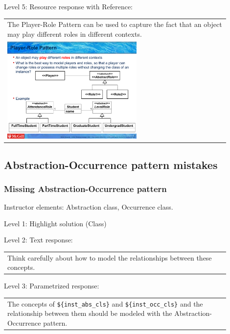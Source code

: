 \noindent Level 5: Resource response with Reference: \medskip

\begin{tabular}{|p{0.9\linewidth}}
The Player-Role Pattern can be used to capture the fact that an object may play different roles
in different contexts.

\\
\includegraphics[width=0.6\textwidth]{images/player_role.png}
\end{tabular} \medskip


\subsection{Abstraction-Occurrence pattern mistakes}

\subsubsection{Missing Abstraction-Occurrence pattern}

Instructor elements: Abstraction class, Occurrence class. \medskip

\noindent Level 1: Highlight solution (Class) \medskip

\noindent Level 2: Text response: \medskip

\begin{tabular}{|p{0.9\linewidth}}
Think carefully about how to model the relationships between these concepts.
\end{tabular} \medskip

\noindent Level 3: Parametrized response: \medskip

\begin{tabular}{|p{0.9\linewidth}}
The concepts of \verb|${inst_abs_cls}| and \verb|${inst_occ_cls}| and the relationship between them should be modeled with the Abstraction-Occurrence pattern.
\end{tabular} \medskip

